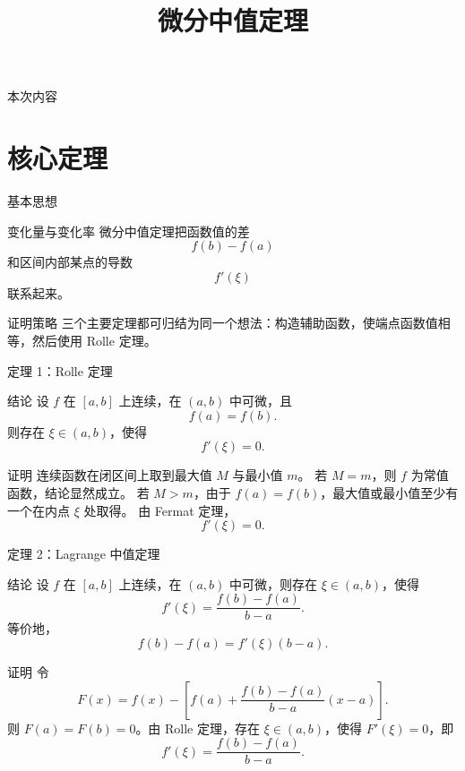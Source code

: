 \documentclass[aspectratio=169,10pt]{ctexbeamer}
\title{微分中值定理}
\subtitle{}
\author{}
\date{}
\begin{document}
\begin{frame}
  \titlepage
\end{frame}

\begin{frame}{本次内容}
\small
\tableofcontents
\end{frame}

\section{核心定理}

\begin{frame}[t]{基本思想}
\small
\begin{block}{变化量与变化率}
微分中值定理把函数值的差
\[
  f(b)-f(a)
\]
和区间内部某点的导数
\[
  f'(\xi)
\]
联系起来。
\end{block}

\begin{block}{证明策略}
三个主要定理都可归结为同一个想法：构造辅助函数，使端点函数值相等，然后使用 Rolle 定理。
\end{block}
\end{frame}

\begin{frame}[t]{定理 1：Rolle 定理}
\small
\begin{block}{结论}
设 $f$ 在 $[a,b]$ 上连续，在 $(a,b)$ 中可微，且
\[
  f(a)=f(b).
\]
则存在 $\xi\in(a,b)$，使得
\[
  f'(\xi)=0.
\]
\end{block}

\begin{block}{证明}
连续函数在闭区间上取到最大值 $M$ 与最小值 $m$。
若 $M=m$，则 $f$ 为常值函数，结论显然成立。
若 $M>m$，由于 $f(a)=f(b)$，最大值或最小值至少有一个在内点 $\xi$ 处取得。
由 Fermat 定理，
\[
  f'(\xi)=0.
\]
\end{block}
\end{frame}

\begin{frame}[t,shrink=5]{定理 2：Lagrange 中值定理}
\small
\begin{block}{结论}
设 $f$ 在 $[a,b]$ 上连续，在 $(a,b)$ 中可微，则存在 $\xi\in(a,b)$，使得
\[
  f'(\xi)=\frac{f(b)-f(a)}{b-a}.
\]
等价地，
\[
  f(b)-f(a)=f'(\xi)(b-a).
\]
\end{block}

\begin{block}{证明}
令
\[
  F(x)=f(x)-\left[f(a)+\frac{f(b)-f(a)}{b-a}(x-a)\right].
\]
则 $F(a)=F(b)=0$。由 Rolle 定理，存在 $\xi\in(a,b)$，使得 $F'(\xi)=0$，即
\[
  f'(\xi)=\frac{f(b)-f(a)}{b-a}.
\]
\end{block}
\end{frame}
\end{document}
